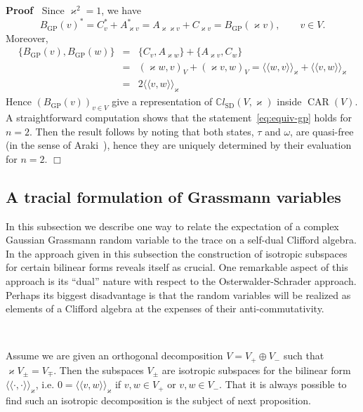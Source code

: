 \documentclass{article}
\newcommand{\llangle}{{\langle\!\langle}}
\newcommand{\rrangle}{{\rangle\!\rangle}}
\newcommand{\tmop}[1]{\ensuremath{\operatorname{#1}}}
\newenvironment{proof}{\noindent\textbf{Proof\ }}{\hspace*{\fill}$\Box$\medskip}
\begin{document}
\begin{proof}
  Since $\varkappa^2 = 1$, we have
  \[ B_{\tmop{GP}} (v)^{\ast} = C_v^{\ast} + A_{\varkappa v}^{\ast} =
     A_{\varkappa \varkappa v} + C_{\varkappa v} = B_{\tmop{GP}} (\varkappa
     v), \qquad v \in V. \]
  Moreover,
  \begin{eqnarray*}
    \{ B_{\tmop{GP}} (v), B_{\tmop{GP}} (w) \} & = & \{ C_v, A_{\varkappa w}
    \} + \{ A_{\varkappa v}, C_w \}\\
    & = & (\varkappa w, v)_V + (\varkappa v, w)_V = \llangle w, v
    \rrangle_{\varkappa} + \llangle v, w \rrangle_{\varkappa}\\
    & = & 2 \llangle v, w \rrangle_{\varkappa}
  \end{eqnarray*}
  Hence $(B_{\tmop{GP}} (v))_{v \in V}$ give a representation of
  $\mathbb{C}l_{\tmop{SD}} (V, \varkappa)$ inside $\tmop{CAR} (V)$. A
  straightforward computation shows that the statement~{\eqref{eq:equiv-gp}}
  holds for $n = 2$. Then the result follows by noting that both states,
  $\tau$ and $\omega$, are quasi-free (in the sense of
  Araki~{\cite{araki_quasifree_1970}}), hence they are uniquely determined by
  their evaluation for $n = 2$.
\end{proof}

\subsection{A tracial formulation of Grassmann variables}

In this subsection we describe one way to relate the expectation of a complex
Gaussian Grassmann random variable to the trace on a self-dual Clifford
algebra. In the approach given in this subsection the construction of
isotropic subspaces for certain bilinear forms reveals itself as crucial. One
remarkable aspect of this approach is its ``dual'' nature with respect to the
Osterwalder-Schrader approach. Perhaps its biggest disadvantage is that the
random variables will be realized as elements of a Clifford algebra at the
expenses of their anti-commutativity.

\

Assume we are given an orthogonal decomposition $V = V_+ \oplus V_-$ such
that $\varkappa V_{\pm} = V_{\mp}$. Then the subspaces $V_{\pm}$ are isotropic
subspaces for the bilinear form $\llangle \cdot, \cdot \rrangle_{\varkappa}$,
i.e. $0 = \llangle v, w \rrangle_{\varkappa}$ if $v, w \in V_+$ or $v, w \in
V_-$. That it is always possible to find such an isotropic decomposition is
the subject of next proposition.
\end{document}
